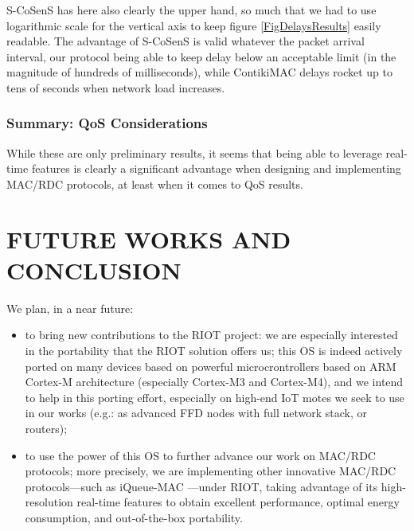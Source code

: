 \documentclass[a4paper,twoside]{article}
\begin{document}
S-CoSenS has here also clearly the upper hand, so much that we had to use
logarithmic scale for the vertical axis to keep figure \ref{FigDelaysResults}
easily readable. The advantage of S-CoSenS is valid whatever the packet
arrival interval, our protocol being able to keep delay below an acceptable
limit (in the magnitude of hundreds of milliseconds), while ContikiMAC
delays rocket up to tens of seconds when network load increases.

\subsubsection{Summary: QoS Considerations}

While these are only preliminary results, it seems that being able to
leverage real-time features is clearly a significant advantage when designing
and implementing MAC/RDC protocols, at least when it comes to QoS results.



\section{\uppercase{Future Works and Conclusion}}

We plan, in a near future:

\begin{itemize}

\item to bring new contributions to the RIOT project: we are especially
      interested in the portability that the RIOT solution offers us;
      this OS is indeed actively ported on many devices based on powerful
      microcrontrollers based on ARM Cortex-M architecture (especially
      Cortex-M3 and Cortex-M4), and we intend to help in this porting
      effort, especially on high-end IoT motes we seek to use in our
      works (e.g.: as advanced FFD nodes with full network stack,
      or routers);

\item to use the power of this OS to further advance our work on MAC/RDC
      protocols; more precisely, we are implementing other innovative
      MAC/RDC protocols---such as iQueue-MAC \cite{iQueueMAC}---under RIOT,
      taking advantage of its high-resolution real-time features to obtain
      excellent performance, optimal energy consumption, and out-of-the-box
      portability.

\end{itemize}
\end{document}
